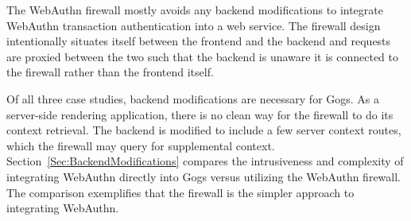 The WebAuthn firewall mostly avoids any backend modifications to integrate WebAuthn transaction authentication into a web service. The firewall design intentionally situates itself between the frontend and the backend and requests are proxied between the two such that the backend is unaware it is connected to the firewall rather than the frontend itself.

Of all three case studies, backend modifications are necessary for Gogs. As a server-side rendering application, there is no clean way for the firewall to do its context retrieval. The backend is modified to include a few server context routes, which the firewall may query for supplemental context. Section~\ref{Sec:BackendModifications} compares the intrusiveness and complexity of integrating WebAuthn directly into Gogs versus utilizing the WebAuthn firewall. The comparison exemplifies that the firewall is the simpler approach to integrating WebAuthn.








